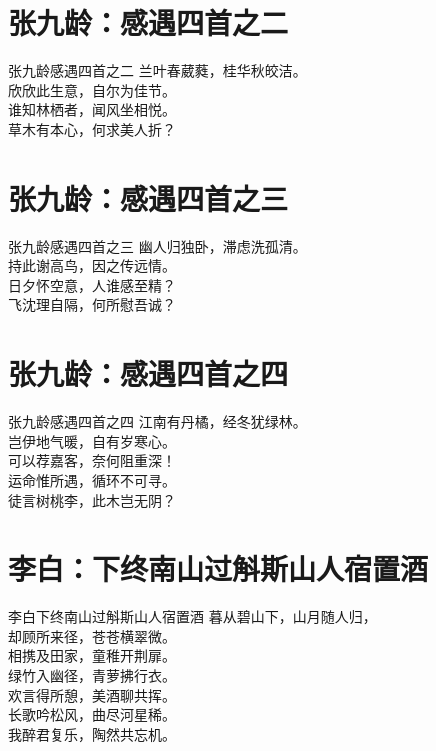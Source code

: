 \documentclass[12pt,oneside,a5paper]{book}
\begin{document}
\chapter{张九龄：感遇四首之二}
\begin{poemzh}{张九龄}{感遇四首之二}
兰叶春葳蕤，桂华秋皎洁。\\
欣欣此生意，自尔为佳节。\\
谁知林栖者，闻风坐相悦。\\
草木有本心，何求美人折？\\ 
\end{poemzh}
  


\chapter{张九龄：感遇四首之三}
\begin{poemzh}{张九龄}{感遇四首之三}
幽人归独卧，滞虑洗孤清。\\
持此谢高鸟，因之传远情。\\
日夕怀空意，人谁感至精？\\
飞沈理自隔，何所慰吾诚？\\ 
\end{poemzh}

\chapter{张九龄：感遇四首之四}
\begin{poemzh}{张九龄}{感遇四首之四}
江南有丹橘，经冬犹绿林。\\
岂伊地气暖，自有岁寒心。\\
可以荐嘉客，奈何阻重深！\\
运命惟所遇，循环不可寻。\\
徒言树桃李，此木岂无阴？\\ 
\end{poemzh}

\chapter{李白：下终南山过斛斯山人宿置酒}
\begin{poemzh}{李白}{下终南山过斛斯山人宿置酒}
暮从碧山下，山月随人归，\\
却顾所来径，苍苍横翠微。\\
相携及田家，童稚开荆扉。\\
绿竹入幽径，青萝拂行衣。\\
欢言得所憩，美酒聊共挥。\\
长歌吟松风，曲尽河星稀。\\
我醉君复乐，陶然共忘机。\\ 
\end{poemzh}
\end{document}
